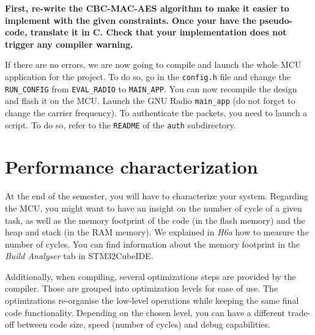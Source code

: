 \textbf{
    First, re-write the CBC-MAC-AES algorithm to make it easier to
    implement with the given constraints. Once your have the pseudo-code, translate it in C. Check that your implementation does not trigger any compiler warning.
}

If there are no errors, we are now going to compile and launch the whole MCU application for the project. To do so, go in the \texttt{config.h} file and change the \texttt{RUN\_CONFIG} from \texttt{EVAL\_RADIO} to \texttt{MAIN\_APP}. You can now recompile the design and flash it on the MCU. Launch the GNU Radio \texttt{main\_app} (do not forget to change the carrier frequency). To authenticate the packets, you need to launch a script. To do so, refer to the \texttt{README} of the \texttt{auth} subdirectory.

\section{Performance characterization}
At the end of the semester, you will have to characterize your system. Regarding the MCU, you might want to have an insight on the number of cycle of a given task, as well as the memory footprint of the code (in the flash memory) and the heap and stack (in the RAM memory). We explained in \emph{H6a} how to measure the number of cycles. You can find information about the memory footprint in the \emph{Build Analyser} tab in STM32CubeIDE.

Additionally, when compiling, several optimizations steps are provided by the compiler. Those are grouped into optimization levels for ease of use. The optimizations re-organise the low-level operations while keeping the same final code functionality. Depending on the chosen level, you can have a different trade-off between code size, speed (number of cycles) and debug capabilities.


